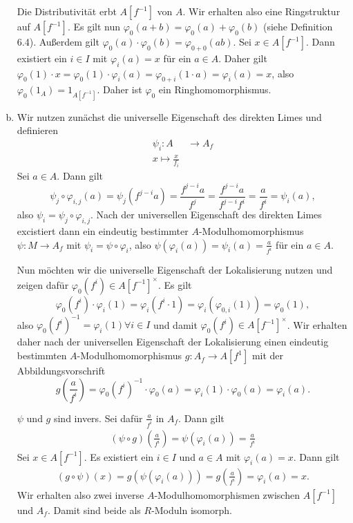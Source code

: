 \documentclass{article}
\begin{document}
\begin{enumerate}[(a)]
    Die Distributivität erbt $A[f^{-1}]$ von $A$. Wir erhalten also eine Ringstruktur auf $A[f^{-1}]$.
    Es gilt nun $\varphi_0( a+b) = \varphi_0(a) + \varphi_0(b)$ (siehe Definition 6.4).
    Außerdem gilt $\varphi_0(a) \cdot \varphi_0(b) = \varphi_{0+0}(ab)$.
    Sei $x \in A[f^{-1}]$. Dann existiert ein $i \in I$ mit $\varphi_i(a) = x$ für ein $a \in  A$. 
    Daher gilt $\varphi_0(1) \cdot x = \varphi_0(1) \cdot \varphi_i(a) = \varphi_{0+i}(1\cdot a) = \varphi_i(a) = x$, also $\varphi_0(1_A) = 1_{A[f^{-1}]}$.
    Daher ist $\varphi_0$ ein Ringhomomorphismus.
    \item Wir nutzen zunächst die universelle Eigenschaft des direkten Limes und definieren
    \begin{align*}
        \psi_i \colon A &\to A_f\\
        x \mapsto \frac{x}{f_i}
    \end{align*}
    Sei $a \in A$. 
    Dann gilt 
    $$\psi_j \circ \varphi_{i,j}(a) = \psi_j(f^{j-i}a) = \frac{f^{j-i}a}{f^j} = \frac{f^{j-i}a}{f^{j-i}f^i} = \frac{a}{f^i} = \psi_i(a),$$
    also $\psi_i = \psi_j \circ \varphi_{i,j}$. Nach der universellen Eigenschaft des direkten Limes excistiert dann ein eindeutig bestimmter 
    $A$-Modulhomomorphismus $\psi\colon M\to A_f$ mit $\psi_i = \psi \circ \varphi_i$, 
    also $\psi(\varphi_i(a)) = \psi_i(a) = \frac{a}{f^i}$ für ein $a \in A$.

    Nun möchten wir die universelle Eigenschaft der Lokalisierung nutzen und zeigen dafür $\varphi_0(f^i) \in A[f^{-1}]^\times$.
    Es gilt 
    $$\varphi_0(f^i)\cdot \varphi_i(1) =  \varphi_i(f^i \cdot 1) = \varphi_i(\varphi_{0,i}(1)) = \varphi_0(1),$$
    also $\varphi_0(f^i)^{-1} = \varphi_i(1) \forall i \in I$ und damit $\varphi_0(f^i) \in A[f^{-1}]^\times$.
    Wir erhalten daher nach der universellen Eigenschaft der Lokalisierung einen eindeutig bestimmten $A$-Modulhomomorphismus 
    $g \colon A_f \to A[f^{1}]$ mit der Abbildungsvorschrift 
    $$g\left( \frac{a}{f^i} \right) = \varphi_0(f^i)^{-1} \cdot \varphi_0(a) = \varphi_i(1) \cdot \varphi_0(a) = \varphi_i(a).$$
    
    $\psi$ und $g$ sind invers.
    Sei dafür $\frac{a}{f^i}$ in $A_f$. Dann gilt
    \begin{align*}
        (\psi \circ g)\left( \frac{a}{f^i} \right) = \psi(\varphi_i(a)) = \frac{a}{f^i}
    \end{align*}
    Sei $x \in A[f^{-1}]$. Es existiert ein $i \in I$ und $a \in A$  mit $\varphi_i(a) = x$.
    Dann gilt
    \begin{align*}
        (g\circ \psi)(x) = g(\psi(\varphi_i(a))) = g\left( \frac{a}{f^i} \right) = \varphi_i(a) = x.
    \end{align*}
    Wir erhalten also zwei inverse $A$-Modulhomomorphismen zwischen $A[f^{-1}]$ und $A_f$. Damit sind beide als $R$-Moduln isomorph.
\end{enumerate}
\end{document}
